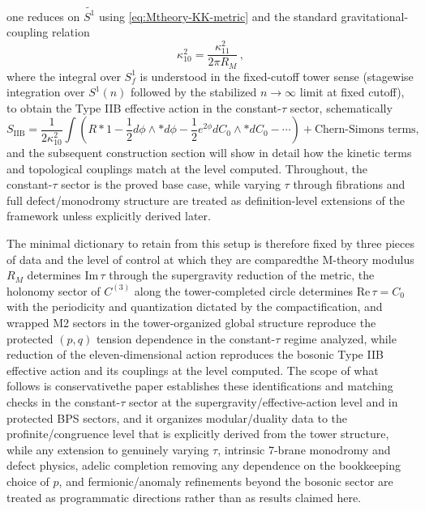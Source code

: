 \documentclass[11pt]{article}
\theoremstyle{remark}
\newcommand{\tS}{\widetilde{S^{1}}}
\begin{document}
one reduces on \(\tS\) using \eqref{eq:Mtheory-KK-metric} and the standard gravitational-coupling relation
\begin{equation}\label{eq:kappa10-kappa11}
\kappa_{10}^2=\frac{\kappa_{11}^2}{2\pi R_M}\,,
\end{equation}
where the integral over $S_f^1$ is understood in the fixed-cutoff tower sense (stagewise integration over $S^1(n)$
followed by the stabilized $n\to\infty$ limit at fixed cutoff), to obtain the Type IIB effective action in the
constant-$\tau$ sector, schematically
\begin{equation}
S_{\mathrm{IIB}} = \frac{1}{2 \kappa_{10}^{2}} \int \left( R * 1 - \frac{1}{2} d \phi \wedge * d \phi - \frac{1}{2} e^{2 \phi} d C_{0} \wedge * d C_{0} - \cdots \right) + \text{Chern-Simons terms},
\end{equation}
and the subsequent construction section will show in detail how the kinetic terms and topological couplings match at the level computed. Throughout, the constant-\(\tau\) sector is the proved base case, while varying \(\tau\) through fibrations and full defect/monodromy structure are treated as definition-level extensions of the framework unless explicitly derived later.

The minimal dictionary to retain from this setup is therefore fixed by three pieces of data and the level of control at which they are compared\:the M-theory modulus \(R_M\) determines \(\mathrm{Im}\,\tau\) through the supergravity reduction of the metric, the holonomy sector of \(C^{(3)}\) along the tower-completed circle determines \(\mathrm{Re}\,\tau=C_0\) with the periodicity and quantization dictated by the compactification, and wrapped M2 sectors in the tower-organized global structure reproduce the protected \((p,q)\) tension dependence in the constant-\(\tau\) regime analyzed, while reduction of the eleven-dimensional action reproduces the bosonic Type IIB effective action and its couplings at the level computed. The scope of what follows is conservative\:the paper establishes these identifications and matching checks in the constant-\(\tau\) sector at the supergravity/effective-action level and in protected BPS sectors, and it organizes modular/duality data to the profinite/congruence level that is explicitly derived from the tower structure, while any extension to genuinely varying \(\tau\), intrinsic 7-brane monodromy and defect physics, adelic completion removing any dependence on the bookkeeping choice of \(p\), and fermionic/anomaly refinements beyond the bosonic sector are treated as programmatic directions rather than as results claimed here.
\end{document}
